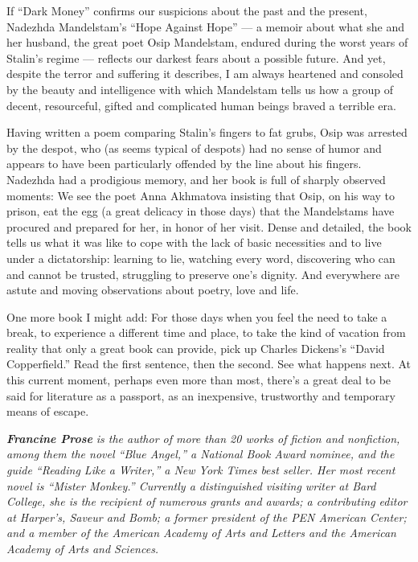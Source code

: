 If ``Dark Money'' confirms our suspicions about the past and the
present, Nadezhda Mandelstam's ``Hope Against Hope'' --- a memoir about
what she and her husband, the great poet Osip Mandelstam, endured during
the worst years of Stalin's regime --- reflects our darkest fears about
a possible future. And yet, despite the terror and suffering it
describes, I am always heartened and consoled by the beauty and
intelligence with which Mandelstam tells us how a group of decent,
resourceful, gifted and complicated human beings braved a terrible era.

Having written a poem comparing Stalin's fingers to fat grubs, Osip was
arrested by the despot, who (as seems typical of despots) had no sense
of humor and appears to have been particularly offended by the line
about his fingers. Nadezhda had a prodigious memory, and her book is
full of sharply observed moments: We see the poet Anna Akhmatova
insisting that Osip, on his way to prison, eat the egg (a great delicacy
in those days) that the Mandelstams have procured and prepared for her,
in honor of her visit. Dense and detailed, the book tells us what it was
like to cope with the lack of basic necessities and to live under a
dictatorship: learning to lie, watching every word, discovering who can
and cannot be trusted, struggling to preserve one's dignity. And
everywhere are astute and moving observations about poetry, love and
life.

One more book I might add: For those days when you feel the need to take
a break, to experience a different time and place, to take the kind of
vacation from reality that only a great book can provide, pick up
Charles Dickens's ``David Copperfield.'' Read the first sentence, then
the second. See what happens next. At this current moment, perhaps even
more than most, there's a great deal to be said for literature as a
passport, as an inexpensive, trustworthy and temporary means of escape.

\emph{\textbf{Francine Prose}} \emph{is the author of more than 20 works
of fiction and nonfiction, among them the novel ``Blue Angel,'' a
National Book Award nominee, and the guide ``Reading Like a Writer,'' a
New York Times best seller. Her most recent novel is ``Mister Monkey.''
Currently a distinguished visiting writer at Bard College, she is the
recipient of numerous grants and awards; a contributing editor at
Harper's, Saveur and Bomb; a former president of the PEN American
Center; and a member of the American Academy of Arts and Letters and the
American Academy of Arts and Sciences.}

